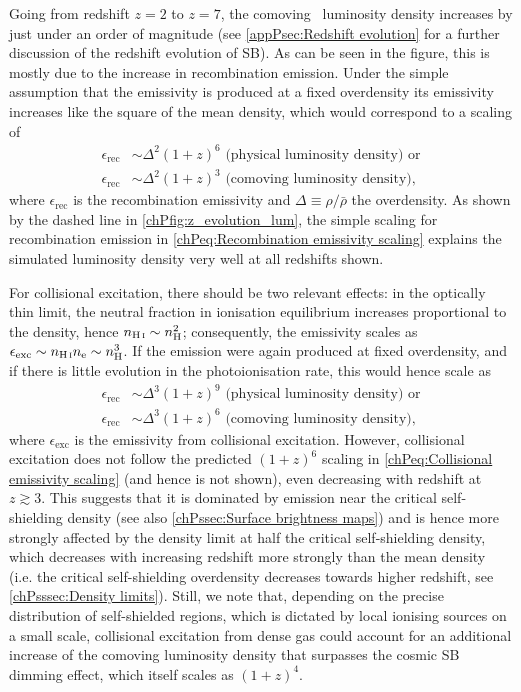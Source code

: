Going from redshift $z=2$ to $z=7$, the comoving \lya\ luminosity density increases by just under an order of magnitude (see \cref{appPsec:Redshift evolution} for a further discussion of the redshift evolution of SB). As can be seen in the figure, this is mostly due to the increase in recombination emission. Under the simple assumption that the emissivity is produced at a fixed overdensity its emissivity increases like the square of the mean density, which would correspond to a scaling of
\begin{align}
    \label{chPeq:Recombination emissivity scaling}
    \epsilon_\text{rec} & \sim \Delta^2 (1+z)^6 \text{ (physical luminosity density) or} \\ \nonumber
    \epsilon_\text{rec} & \sim \Delta^2 (1+z)^3 \text{ (comoving luminosity density),}
\end{align}
where $\epsilon_\text{rec}$ is the recombination emissivity and $\Delta \equiv \rho/\bar{\rho}$ the overdensity. As shown by the dashed line in \cref{chPfig:z_evolution_lum}, the simple scaling for recombination emission in \cref{chPeq:Recombination emissivity scaling} explains the simulated luminosity density very well at all redshifts shown.

For collisional excitation, there should be two relevant effects: in the optically thin limit, the neutral fraction in ionisation equilibrium increases proportional to the density, hence $n_\text{\ion{H}{I}} \sim n_\text{H}^2$; consequently, the emissivity scales as $\epsilon_\text{exc} \sim n_\text{\ion{H}{I}} n_\text{e} \sim n_\text{H}^3$. If the emission were again produced at fixed overdensity, and if there is little evolution in the photoionisation rate, this would hence scale as
\begin{align}
    \label{chPeq:Collisional emissivity scaling}
    \epsilon_\text{rec} & \sim \Delta^3 (1+z)^9 \text{ (physical luminosity density) or} \\ \nonumber
    \epsilon_\text{rec} & \sim \Delta^3 (1+z)^6 \text{ (comoving luminosity density),}
\end{align}
where $\epsilon_\text{exc}$ is the emissivity from collisional excitation. However, collisional excitation does not follow the predicted $(1+z)^6$ scaling in \cref{chPeq:Collisional emissivity scaling} (and hence is not shown), even decreasing with redshift at $z \gtrsim 3$. This suggests that it is dominated by emission near the critical self-shielding density (see also \cref{chPssec:Surface brightness maps}) and is hence more strongly affected by the density limit at half the critical self-shielding density, which decreases with increasing redshift more strongly than the mean density (i.e. the critical self-shielding overdensity decreases towards higher redshift, see \cref{chPsssec:Density limits}). Still, we note that, depending on the precise distribution of self-shielded regions, which is dictated by local ionising sources on a small scale, collisional excitation from dense gas could account for an additional increase of the comoving luminosity density that surpasses the cosmic SB dimming effect, which itself scales as $(1+z)^4$.

